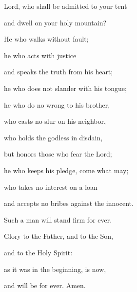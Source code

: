 \noindent Lord, who shall be admitted to your tent~\GreStar{}~\nopagebreak

and dwell on your holy mountain?

\noindent He who walks without fault;~\GreStar{}~\nopagebreak

he who acts with justice

\noindent and speaks the truth from his heart;~\GreStar{}~\nopagebreak

he who does not slander with his tongue;

\noindent he who do no wrong to his brother,~\GreStar{}~\nopagebreak

who casts no slur on his neighbor,

\noindent who holds the godless in disdain,~\GreStar{}~\nopagebreak

but honors those who fear the Lord;

\noindent he who keeps his pledge, come what may;~\GreStar{}~\nopagebreak

who takes no interest on a loan

\noindent and accepts no bribes against the innocent.~\GreStar{}~\nopagebreak

Such a man will stand firm for ever.

\noindent Glory to the Father, and to the Son,~\GreStar{}~\nopagebreak

and to the Holy Spirit:

\noindent as it was in the beginning, is now,~\GreStar{}~\nopagebreak

and will be for ever. Amen.

